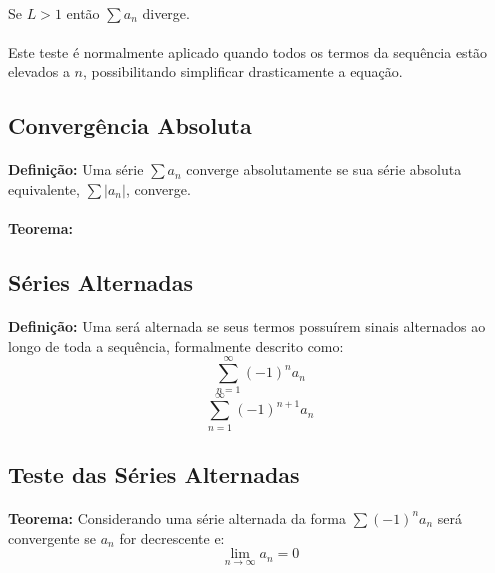 \documentclass{article}
\begin{document}
\begin{enumerate}[rightmargin = \leftmargin]
        \paragraph{}Se $L>1$ então $\sum a_{n}$ diverge.
        \paragraph{}Este teste é normalmente aplicado quando todos os termos da sequência estão elevados a $n$, possibilitando simplificar drasticamente a equação.

    \subsection{Convergência Absoluta}
        \paragraph{}\textbf{Definição:} Uma série $\sum a_{n}$ converge absolutamente se sua série absoluta equivalente, $\sum |a_{n}|$, converge.
        \paragraph{}\textbf{Teorema:}
        
    \subsection{Séries Alternadas}
        \paragraph{}\textbf{Definição:} Uma será alternada se seus termos possuírem sinais alternados ao longo de toda a sequência, formalmente descrito como:
            \[\sum\limits_{n=1}^{\infty}(-1)^{n}a_{n}\]
            \[\sum\limits_{n=1}^{\infty}(-1)^{n+1}a_{n}\]
    
    \subsection{Teste das Séries Alternadas}
        \paragraph{}\textbf{Teorema:} Considerando uma série alternada da forma $\sum {(-1)}^{n}a_{n}$ será convergente se $a_{n}$ for decrescente e:
            \[\lim_{n\to\infty}a_{n}=0\]
            

\end{enumerate}
\end{document}
